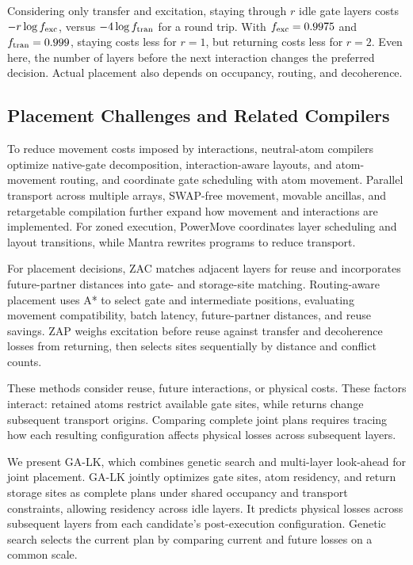 \begin{samepage}
Considering only transfer and excitation, staying through $r$ idle gate layers costs $-r\log f_{\rm exc}$, versus $-4\log f_{\rm tran}$ for a round trip. With $f_{\rm exc}=0.9975$ and $f_{\rm tran}=0.999$, staying costs less for $r=1$, but returning costs less for $r=2$. Even here, the number of layers before the next interaction changes the preferred decision. Actual placement also depends on occupancy, routing, and decoherence.\par
\end{samepage}

\subsection{Placement Challenges and Related Compilers}

To reduce movement costs imposed by interactions, neutral-atom compilers optimize native-gate decomposition, interaction-aware layouts, and atom-movement routing\cite{patel2022geyser,patel2023graphine,tan2022mapping,schmid2024hybrid}, and coordinate gate scheduling with atom movement\cite{tan2024olsqdpqa,tan2025enola}. Parallel transport across multiple arrays\cite{wang2024atomique}, SWAP-free movement\cite{ludmir2024parallax}, movable ancillas\cite{wang2024qpilot}, and retargetable compilation\cite{kirmemis2025weaver} further expand how movement and interactions are implemented. For zoned execution, PowerMove coordinates layer scheduling and layout transitions\cite{ruan2025powermove}, while Mantra rewrites programs to reduce transport\cite{jang2025mantra}.

For placement decisions, ZAC matches adjacent layers for reuse and incorporates future-partner distances into gate- and storage-site matching\cite{lin2025zac}. Routing-aware placement uses A* to select gate and intermediate positions, evaluating movement compatibility, batch latency, future-partner distances, and reuse savings\cite{stade2025routingaware}. ZAP weighs excitation before reuse against transfer and decoherence losses from returning, then selects sites sequentially by distance and conflict counts\cite{huang2026zap}.

These methods consider reuse, future interactions, or physical costs. These factors interact: retained atoms restrict available gate sites, while returns change subsequent transport origins\cite{lin2025zac}. Comparing complete joint plans requires tracing how each resulting configuration affects physical losses across subsequent layers.

\label{sec:contributions}
We present GA-LK, which combines genetic search and multi-layer look-ahead for joint placement. GA-LK jointly optimizes gate sites, atom residency, and return storage sites as complete plans under shared occupancy and transport constraints, allowing residency across idle layers. It predicts physical losses across subsequent layers from each candidate's post-execution configuration. Genetic search selects the current plan by comparing current and future losses on a common scale.
